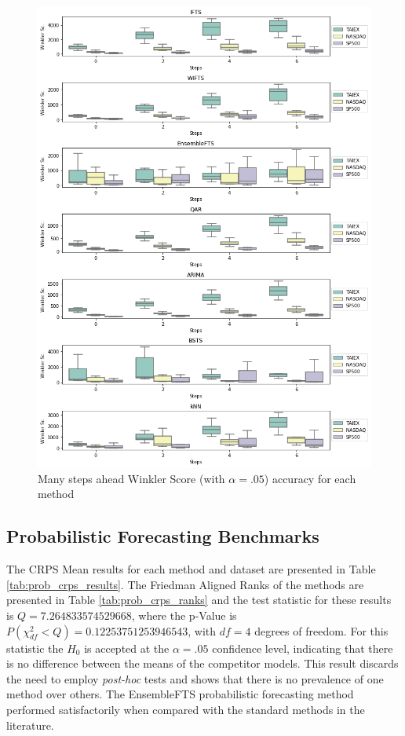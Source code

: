 \begin{figure}[htb]
    \centering
    \includegraphics[width=\textwidth]{figures/interval_many_steps.png}
    \caption{Many steps ahead Winkler Score (with $\alpha=.05$) accuracy for each method}
    \label{fig:interval_many_steps}
\end{figure}

%
\subsection{Probabilistic Forecasting Benchmarks}
\label{sec:prob_experiments_probabilistic}

The CRPS Mean results for each method and dataset are presented in Table \ref{tab:prob_crps_results}. The Friedman Aligned Ranks of the methods are presented in Table \ref{tab:prob_crps_ranks} and the test statistic for these results is $Q = 7.264833574529668$, where the p-Value is $P(\chi ^2_{df} < Q) = 0.12253751253946543$, with $df=4$ degrees of freedom. For this statistic the $H_0$ is accepted at the $\alpha = .05$ confidence level, indicating that there is no difference between the means of the competitor models. This result discards the need to employ \textit{post-hoc} tests and shows that there is no prevalence of one method over others. The EnsembleFTS probabilistic forecasting method performed satisfactorily when compared with the standard methods in the literature. 

